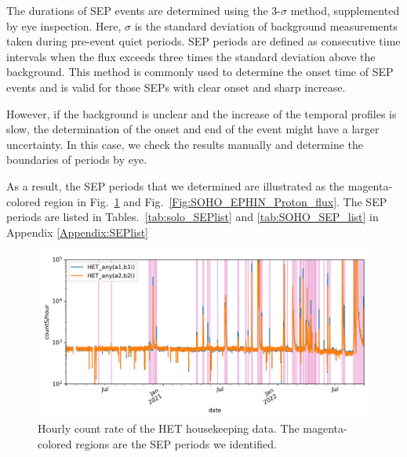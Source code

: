 The durations of \ac{SEP} events are determined using the 3-$\sigma$ method, supplemented by eye inspection. Here, $\sigma$ is the standard deviation of background measurements taken during pre-event quiet periods. \ac{SEP} periods are defined as consecutive time intervals when the flux exceeds three times the standard deviation above the background. This method is commonly used to determine the onset time of \ac{SEP} events and is valid for those \acp{SEP} with clear onset and sharp increase.

However, if the background is unclear and the increase of the temporal profiles is slow, the determination of the onset and end of the event might have a larger uncertainty. In this case, we check the results manually and determine the boundaries of periods by eye.

As a result, the \ac{SEP} periods that we determined are illustrated as the magenta-colored region in Fig.~\ref{Fig:solo-lvl2} and Fig.~\ref{Fig:SOHO_EPHIN_Proton_flux}. The \ac{SEP} periods are listed in Tables.~\ref{tab:solo_SEPlist} and \ref{tab:SOHO_SEP_list} in Appendix \ref{Appendix:SEPlist}





\begin{figure}
    \centering
    \includegraphics[width = \textwidth]{images/ACR/SOLO-lvl2-trriger-V2.png}
    \caption[Housekeeping data of \ac{HET}]{Hourly count rate of the \ac{HET} housekeeping data. The magenta-colored regions are the \ac{SEP} periods we identified.}
    \label{Fig:solo-lvl2}
\end{figure}



